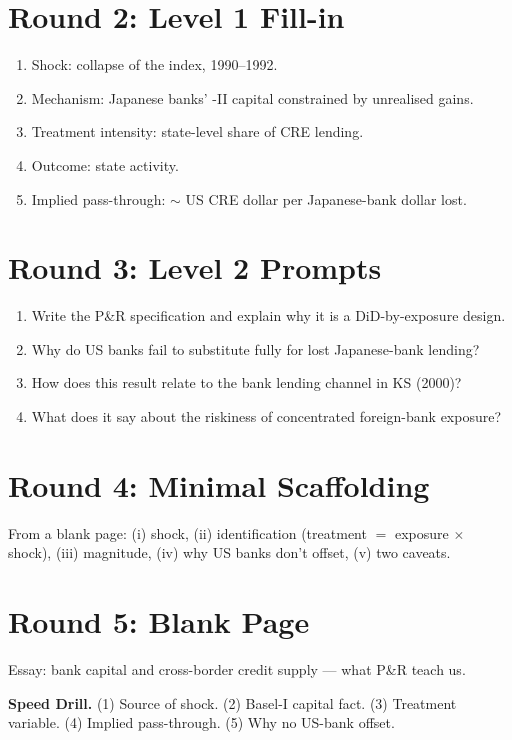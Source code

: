 \documentclass[11pt]{article}
\newcommand{\blank}[1]{\underline{\hspace{#1}}}
\begin{document}
\section*{Round 2: Level 1 Fill-in}
\begin{enumerate}
\item Shock: collapse of the \blank{1.5cm} index, 1990--1992.
\item Mechanism: Japanese banks' \blank{1cm}-II capital constrained by unrealised \blank{1cm} gains.
\item Treatment intensity: state-level \blank{1.5cm} share of CRE lending.
\item Outcome: state \blank{2cm} activity.
\item Implied pass-through: $\sim$\blank{1cm} US CRE dollar per Japanese-bank dollar lost.
\end{enumerate}

\section*{Round 3: Level 2 Prompts}
\begin{enumerate}
\item Write the P\&R specification and explain why it is a DiD-by-exposure design.
\item Why do US banks fail to substitute fully for lost Japanese-bank lending?
\item How does this result relate to the bank lending channel in KS (2000)?
\item What does it say about the riskiness of concentrated foreign-bank exposure?
\end{enumerate}

\section*{Round 4: Minimal Scaffolding}
From a blank page: (i) shock, (ii) identification (treatment $=$ exposure $\times$ shock), (iii) magnitude, (iv) why US banks don't offset, (v) two caveats.

\section*{Round 5: Blank Page}
Essay: bank capital and cross-border credit supply --- what P\&R teach us.

\vspace{6pt}
\begin{drillbox}
\textbf{Speed Drill.} (1) Source of shock. (2) Basel-I capital fact. (3) Treatment variable. (4) Implied pass-through. (5) Why no US-bank offset.
\end{drillbox}
\end{document}
